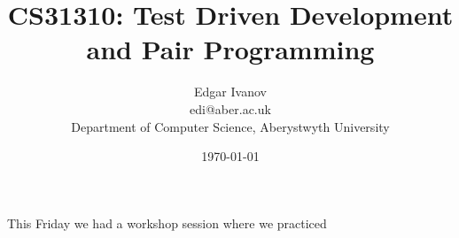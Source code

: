 \documentclass[]{report}
\begin{document}
\title{CS31310: Test Driven Development and Pair Programming}
\author{Edgar Ivanov\\ edi@aber.ac.uk \\ Department of Computer Science, Aberystwyth University}
\date{\today}
\maketitle

This Friday we had a workshop session where we practiced  



\end{document}
